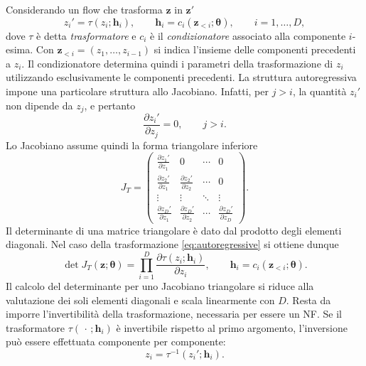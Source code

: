 Considerando un flow che trasforma $ \mathbf{z} $ in $ \mathbf{z}' $
\begin{equation}
    z_i' = \tau(z_i;\mathbf{h}_i),
    \qquad
    \mathbf{h}_i = c_i(\mathbf{z}_{<i};\boldsymbol{\theta}),
    \qquad i=1,\dots,D,
    \label{eq:autoregressive}
\end{equation}
dove $\tau$ è detta \emph{trasformatore} e $c_i$ è il \emph{condizionatore} associato alla componente $i$-esima. Con
$\mathbf{z}_{<i}=(z_1,\dots,z_{i-1})$ si indica l'insieme delle componenti precedenti a $z_i$. Il condizionatore determina quindi i parametri della trasformazione di $z_i$ utilizzando esclusivamente le componenti precedenti.
La struttura autoregressiva impone una particolare struttura allo Jacobiano. Infatti, per $j>i$, la quantità $z_i'$ non dipende da $z_j$, e pertanto
\begin{equation}
    \frac{\partial z_i'}{\partial z_j}=0,
    \qquad j>i.
\end{equation}
Lo Jacobiano assume quindi la forma triangolare inferiore
\begin{equation}
J_T =
\begin{pmatrix}
\frac{\partial z_1'}{\partial z_1} & 0 & \cdots & 0\\
\frac{\partial z_2'}{\partial z_1} &
\frac{\partial z_2'}{\partial z_2} & \cdots & 0\\
\vdots & \vdots & \ddots & \vdots\\
\frac{\partial z_D'}{\partial z_1} &
\frac{\partial z_D'}{\partial z_2} &
\cdots &
\frac{\partial z_D'}{\partial z_D}
\end{pmatrix}.
\end{equation}
Il determinante di una matrice triangolare è dato dal prodotto degli elementi diagonali. Nel caso della trasformazione \eqref{eq:autoregressive} si ottiene dunque
\begin{equation}
    \det J_T(\mathbf{z};\boldsymbol{\theta})
    =
    \prod_{i=1}^{D}
    \frac{\partial \tau(z_i;\mathbf{h}_i)}{\partial z_i},
    \qquad
    \mathbf{h}_i=c_i(\mathbf{z}_{<i};\boldsymbol{\theta}).
    \label{eq:autoregressive_det}
\end{equation}
Il calcolo del determinante per uno Jacobiano triangolare si riduce alla valutazione dei soli elementi diagonali e scala linearmente con $D$.
Resta da imporre l'invertibilità della trasformazione, necessaria per essere un NF. Se il trasformatore $\tau(\,\cdot\,;\mathbf{h}_i)$ è invertibile rispetto al primo argomento, l'inversione può essere effettuata componente per componente:
\begin{equation}
    z_i =
    \tau^{-1}(z_i';\mathbf{h}_i).
\end{equation}

